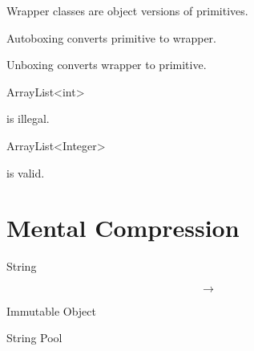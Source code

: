 \documentclass[11pt,a4paper]{book}
\begin{document}

\begin{rosettarule}

Wrapper classes are object versions
of primitives.

\end{rosettarule}


\begin{rosettarule}

Autoboxing converts primitive
to wrapper.

\end{rosettarule}


\begin{rosettarule}

Unboxing converts wrapper
to primitive.

\end{rosettarule}


\begin{rosettarule}

ArrayList<int>

is illegal.

\end{rosettarule}


\begin{rosettarule}

ArrayList<Integer>

is valid.

\end{rosettarule}


\section{Mental Compression}

String

\[
\rightarrow
\]

Immutable Object


String Pool
\end{document}
